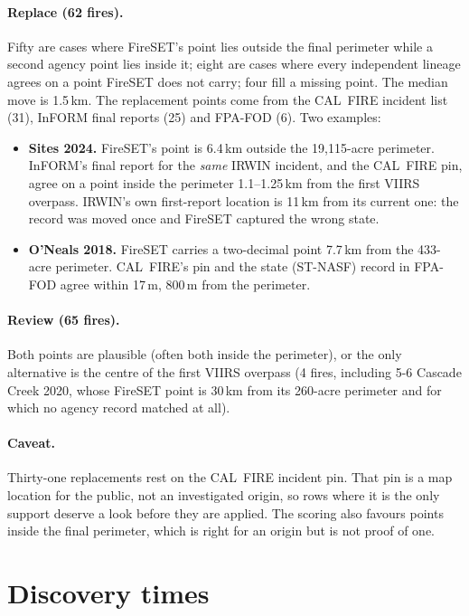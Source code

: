 \documentclass[11pt,a4paper]{article}
\begin{document}
\paragraph{Replace (62 fires).} Fifty are cases where FireSET's point lies outside the final perimeter while a
second agency point lies inside it; eight are cases where every independent lineage agrees on a point FireSET
does not carry; four fill a missing point. The median move is 1.5\,km. The replacement points come from the
CAL~FIRE incident list (31), InFORM final reports (25) and FPA-FOD (6). Two examples:

\begin{itemize}
\item \textbf{Sites 2024.} FireSET's point is 6.4\,km outside the 19,115-acre perimeter. InFORM's final report
for the \emph{same} IRWIN incident, and the CAL~FIRE pin, agree on a point inside the perimeter 1.1--1.25\,km
from the first VIIRS overpass. IRWIN's own first-report location is 11\,km from its current one: the record
was moved once and FireSET captured the wrong state.
\item \textbf{O'Neals 2018.} FireSET carries a two-decimal point 7.7\,km from the 433-acre perimeter. CAL~FIRE's
pin and the state (ST-NASF) record in FPA-FOD agree within 17\,m, 800\,m from the perimeter.
\end{itemize}

\paragraph{Review (65 fires).} Both points are plausible (often both inside the perimeter), or the only
alternative is the centre of the first VIIRS overpass (4 fires, including 5-6 Cascade Creek 2020, whose FireSET
point is 30\,km from its 260-acre perimeter and for which no agency record matched at all).

\paragraph{Caveat.} Thirty-one replacements rest on the CAL~FIRE incident pin. That pin is a map location for
the public, not an investigated origin, so rows where it is the only support deserve a look before they are
applied. The scoring also favours points inside the final perimeter, which is right for an origin but is not
proof of one.

\section{Discovery times}
\end{document}
